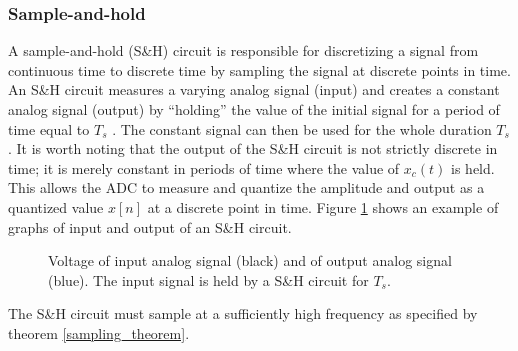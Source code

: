 \subsubsection{Sample-and-hold}
A sample-and-hold (S\&H) circuit is responsible for discretizing a signal from continuous time to discrete time by sampling the signal at discrete points in time. An S\&H circuit measures a varying analog signal (input) and creates a constant analog signal (output) by ``holding'' the value of the initial signal for a period of time equal to $T_s$ \cite{pelgrom}. The constant signal can then be used for the whole duration $T_s$. It is worth noting that the output of the S\&H circuit is not strictly discrete in time; it is merely constant in periods of time where the value of $x_c(t)$ is held. This allows the ADC to measure and quantize the amplitude and output as a quantized value $x[n]$ at a discrete point in time. Figure \ref{fig:S/H} shows an example of graphs of input and output of an S\&H circuit.
\begin{figure}[H]
\centering
{}
\caption{Voltage of input analog signal (black) and of output analog signal (blue). The input signal is held by a S\&H circuit for $T_s$.}
\label{fig:S/H}
\end{figure}
The S\&H circuit must sample at a sufficiently high frequency as specified by theorem \ref{sampling_theorem}.


